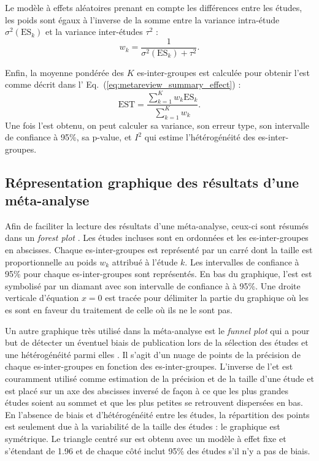 Le modèle à effets aléatoires prenant en compte les différences entre les études, les poids sont égaux à l'inverse de la somme entre la variance intra-étude
$\sigma^2(\text{ES}_k)$ et la variance inter-études $\tau^2$ \citep{Borenstein2009} :
\begin{equation}
\label{eq:metareview_weight_study}
w_k = \frac{1}{\sigma^2(\text{ES}_k) + \tau^2}.
\end{equation} 

Enfin, la moyenne pondérée des $K$ \gls{es}-inter-groupes est calculée pour obtenir l'\gls{est} comme décrit dans l' 
Eq.~(\ref{eq:metareview_summary_effect}) \citep{Borenstein2009}:
\begin{equation}
\label{eq:metareview_summary_effect}
\text{EST} = \frac{\sum_{k=1}^{K} w_k \text{ES}_k} {\sum_{k=1}^{K} w_k}.
\end{equation} 
Une fois l'\gls{est} obtenu, on peut calculer sa variance, son erreur type, son intervalle de confiance à 95\%, sa p-value, 
et $I^2$ qui estime l'hétérogénéité des \gls{es}-inter-groupes. 

\subsection{Répresentation graphique des résultats d'une méta-analyse}

Afin de faciliter la lecture des résultats d'une méta-analyse, ceux-ci sont résumés dans un \textit{forest plot} \citep{Borenstein2009}. Les études incluses sont
en ordonnées et les \gls{es}-inter-groupes en abscisses. Chaque \gls{es}-inter-groupes est représenté par un carré dont la taille est proportionnelle
au poids $w_k$ attribué à l'étude $k$. Les intervalles de confiance à 95\% pour chaque \gls{es}-inter-groupes sont représentés. En bas du graphique, l'\gls{est}
est symbolisé par un diamant avec son intervalle de confiance à à 95\%. Une droite verticale d'équation $x = 0$ est tracée pour délimiter la
partie du graphique où les \gls{es} sont en faveur du traitement de celle où ils ne le sont pas.

Un autre graphique très utilisé dans la méta-analyse est le \textit{funnel plot} qui a pour but de détecter un éventuel biais de publication
lors de la sélection des études et une hétérogénéité parmi elles \citep{Sterne2011}. Il s'agit d'un nuage de points de la précision de chaque 
\gls{es}-inter-groupes en fonction des \gls{es}-inter-groupes. L'inverse de l'\gls{et} est couramment utilisé comme estimation de la précision et de la 
taille d'une étude et est placé sur un axe des abscisses inversé de façon à ce que les plus grandes études soient au sommet et que les plus petites se retrouvent 
dispersées en bas. En l'absence de biais et d'hétérogénéité entre les études, la répartition des points est seulement due à la variabilité de la taille des études : 
le graphique est symétrique. Le triangle centré sur \gls{est} obtenu avec un modèle à effet fixe et s'étendant de 1.96 \gls{et} de chaque côté 
inclut 95\% des études s'il n'y a pas de biais.

